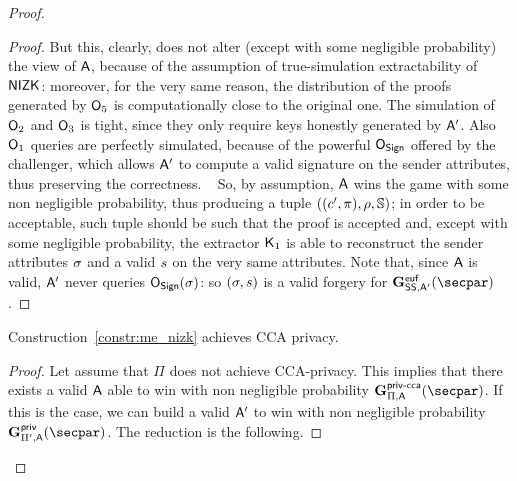 \begin{proof}
\begin{lemma}
\begin{proof}
            But this, clearly, does not alter (except with some negligible probability) the view of $\mathsf{A}$, because of the assumption of true-simulation extractability of $\mathsf{NIZK}$: moreover, for the very same reason, the distribution of the proofs generated by $\mathsf{O}_5$ is computationally close to the original one.
            The simulation of $\mathsf{O}_2$ and $\mathsf{O}_3$ is tight, since they only require keys honestly generated by $\mathsf{A}'$.
            Also $\mathsf{O}_1$ queries are perfectly simulated, because of the powerful $\mathsf{O}_{\mathsf{Sign}}$ offered by the challenger, which allows $\mathsf{A}'$ to compute a valid signature on the sender attributes, thus preserving the correctness.
            ~\newline\newline
            So, by assumption, $\mathsf{A}$ wins the game with some non negligible probability, thus producing a tuple $((c', \pi), \rho, \mathbb{S})$; in order to be acceptable, such tuple should be such that the proof is accepted and, except with some negligible probability, the extractor $\mathsf{K}_1$ is able to reconstruct the sender attributes $\sigma$ and a valid $s$ on the very same attributes.
            Note that, since $\mathsf{A}$ is valid, $\mathsf{A}'$ never queries $\mathsf{O}_{\mathsf{Sign}}(\sigma)$: so $(\sigma, s)$ is a valid forgery for $\Sigeufgame_{\sig, \adversary'}(\secpar)$.
        \end{proof}
    \end{lemma}

    \begin{lemma}\label{lemma:me_priv}
        Construction~\ref{constr:me_nizk} achieves CCA privacy.
        \begin{proof}
            Let assume that $\Pi$ does not achieve CCA-privacy. This implies that there exists a valid $\mathsf{A}$ able to win with non negligible probability $\NISHmatchgamecca{}_{\Pi, \adversary}(\secpar)$. If this is the case, we can build a valid $\mathsf{A}'$ to win with non negligible probability $\NISHmatchgame{}_{\Pi', \adversary}(\secpar)$. The reduction is the following.


\end{proof}
\end{lemma}
\end{proof}

